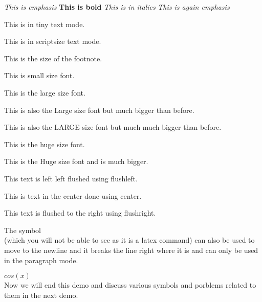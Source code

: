 \documentclass[10pt,a4paper]{book}
\begin{document}
\emph{This is emphasis}
\textbf{This is bold}
\textit{This is in italics}
\emph{This is again emphasis}
\begin{tiny}
This is in tiny text mode.
\end{tiny}
\begin{scriptsize}
This is in scriptsize text mode.
\end{scriptsize}
\begin{footnotesize}
This is the size of the footnote.
\end{footnotesize}
\begin{small}
This is small size font.
\end{small}
\begin{large}
This is the large size font.
\end{large}
\begin{Large}
This is also the Large size font but much bigger than before.
\end{Large}
\begin{LARGE}
This is also the LARGE size font but much much bigger than before.
\end{LARGE}
\begin{huge}
This is the huge size font.
\end{huge}
\begin{Huge}
This is the Huge size font and is much bigger.
\end{Huge}
\begin{flushleft}
This text is left left flushed using flushleft.
\end{flushleft}

\begin{center}
This is text in the center done using center.
\end{center}

\begin{flushright}
This text is flushed to the right using flushright.  
\end{flushright}
The symbol \\ (which you will not be able to see as it is a latex command) can also be used to move to the newline and it breaks the line right where it is and can only be used in the paragraph mode.

$cos(x)$\\
Now we will end this demo and discuss various symbols and porblems related to them in the next demo.
\end{document}
